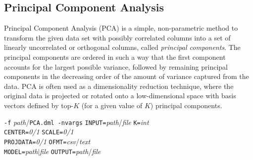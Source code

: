 \begin{comment}

 Licensed to the Apache Software Foundation (ASF) under one
 or more contributor license agreements.  See the NOTICE file
 distributed with this work for additional information
 regarding copyright ownership.  The ASF licenses this file
 to you under the Apache License, Version 2.0 (the
 "License"); you may not use this file except in compliance
 with the License.  You may obtain a copy of the License at

   http://www.apache.org/licenses/LICENSE-2.0

 Unless required by applicable law or agreed to in writing,
 software distributed under the License is distributed on an
 "AS IS" BASIS, WITHOUT WARRANTIES OR CONDITIONS OF ANY
 KIND, either express or implied.  See the License for the
 specific language governing permissions and limitations
 under the License.

\end{comment}

\subsection{Principal Component Analysis}
\label{pca}


Principal Component Analysis (PCA) is a simple, non-parametric method to transform the given data set with possibly correlated columns into a set of linearly uncorrelated or orthogonal columns, called {\em principal components}. The principal components are ordered in such a way that the first component accounts for the largest possible variance, followed by remaining principal components in the decreasing order of the amount of variance captured from the data. PCA is often used as a dimensionality reduction technique, where the original data is projected or rotated onto a low-dimensional space with basis vectors defined by top-$K$ (for a given value of $K$) principal components.
\\


\begin{tabbing}
\texttt{-f} \textit{path}/\texttt{PCA.dml -nvargs} 
\=\texttt{INPUT=}\textit{path}/\textit{file} 
  \texttt{K=}\textit{int} \\
\>\texttt{CENTER=}\textit{0/1}
  \texttt{SCALE=}\textit{0/1}\\
\>\texttt{PROJDATA=}\textit{0/1}
  \texttt{OFMT=}\textit{csv}/\textit{text}\\
\>\texttt{MODEL=}\textit{path}$\vert$\textit{file}
  \texttt{OUTPUT=}\textit{path}/\textit{file}
\end{tabbing}

